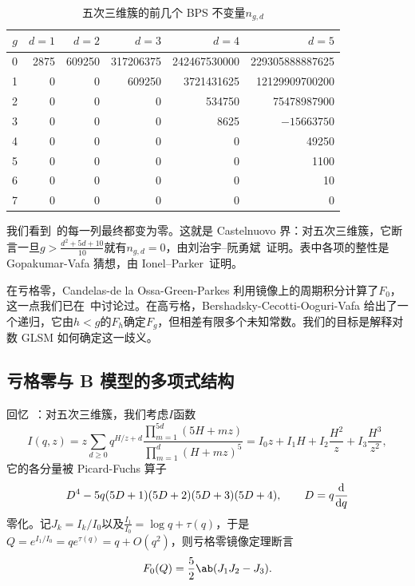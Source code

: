 \documentclass{amsart}
\theoremstyle{definition}
\theoremstyle{remark}
\theoremstyle{plain}
\theoremstyle{definition}
\theoremstyle{remark}
\newcommand{\1}{\mathbf{1}}
\newcommand{\2}{\mathbf{2}}
\newcommand{\3}{\mathbf{3}}
\begin{document}
\begin{table}[htpb]
    \centering
    \caption{五次三维簇的前几个 BPS 不变量\(n_{g,d}\)}
    \label{tab:quinticbps}
    \begin{tabular}{crrrrr}
        \toprule
        \(g\) & \(d=1\) & \(d=2\) & \(d=3\) & \(d=4\) & \(d=5\) \\
        \midrule
        0 & 2875 & 609250 & 317206375 & 242467530000 & 229305888887625 \\
        1 & 0 & 0 & 609250 & 3721431625 & 12129909700200 \\
        2 & 0 & 0 & 0 & 534750 & 75478987900 \\
        3 & 0 & 0 & 0 & 8625 & \(-15663750\) \\
        4 & 0 & 0 & 0 & 0 & 49250 \\
        5 & 0 & 0 & 0 & 0 & 1100 \\
        6 & 0 & 0 & 0 & 0 & 10 \\
        7 & 0 & 0 & 0 & 0 & 0 \\
        \bottomrule
    \end{tabular}
\end{table}

我们看到~的每一列最终都变为零。这就是 Castelnuovo 界：对五次三维簇，它断言一旦\(g > \frac{d^2+5d+10}{10}\)就有\(n_{g,d} = 0\)，由刘治宇--阮勇斌~\cite{LiuRuanCastelnuovo}证明。表中各项的整性是 Gopakumar-Vafa 猜想，由 Ionel--Parker~\cite{IonelParker2018}证明。

在亏格零，Candelas-de la Ossa-Green-Parkes 利用镜像上的周期积分计算了\(F_0\)，这一点我们已在~中讨论过。在高亏格，Bershadsky-Cecotti-Ooguri-Vafa 给出了一个递归，它由\(h < g\)的\(F_h\)确定\(F_g\)，但相差有限多个未知常数。我们的目标是解释对数 GLSM 如何确定这一歧义。

\subsection{亏格零与 B 模型的多项式结构}%
\label{sub:Genus zero and the polynomial structure of the B-model}

回忆~：对五次三维簇，我们考虑\(I\)函数
\[
    I(q,z) = z\sum_{d \geq 0} q^{H/z+d} \frac{\prod_{m=1}^{5d}(5H+mz)}{\prod_{m=1}^d (H+mz)^5} = I_0 z + I_1 H + I_2 \frac{H^2}{z} + I_3 \frac{H^3}{z^2},
\]
它的各分量被 Picard-Fuchs 算子
\[ D^4 - 5q(5D+1)(5D+2)(5D+3)(5D+4), \qquad D = q \odv{}{q} \]
零化。记\(J_k = I_k/I_0\)以及\(\frac{I_1}{I_0} = \log q + \tau(q)\)，于是\(Q = e^{I_1/I_0} = qe^{\tau(q)} = q + O(q^2)\)，则亏格零镜像定理断言
\[ F_0(Q) = \frac{5}{2}\ab(J_1 J_2 - J_3). \]
\end{document}
